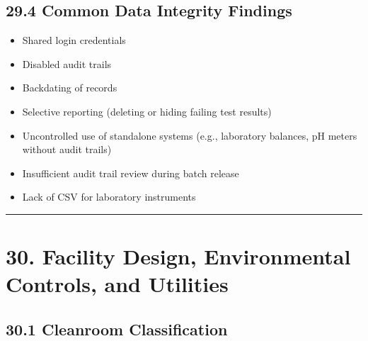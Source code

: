 \documentclass[
  11pt,
  a4paper,
]{report}
\providecommand{\tightlist}{%
  \setlength{\itemsep}{0pt}\setlength{\parskip}{0pt}}
\begin{document}
\hypertarget{common-data-integrity-findings}{%
\subsection{29.4 Common Data Integrity
Findings}\label{common-data-integrity-findings}}

\begin{itemize}
\tightlist
\item
  Shared login credentials
\item
  Disabled audit trails
\item
  Backdating of records
\item
  Selective reporting (deleting or hiding failing test results)
\item
  Uncontrolled use of standalone systems (e.g., laboratory balances, pH
  meters without audit trails)
\item
  Insufficient audit trail review during batch release
\item
  Lack of CSV for laboratory instruments
\end{itemize}

\begin{center}\rule{0.5\linewidth}{0.5pt}\end{center}

\hypertarget{facility-design-environmental-controls-and-utilities}{%
\section{30. Facility Design, Environmental Controls, and
Utilities}\label{facility-design-environmental-controls-and-utilities}}

\hypertarget{cleanroom-classification}{%
\subsection{30.1 Cleanroom
Classification}\label{cleanroom-classification}}
\end{document}
